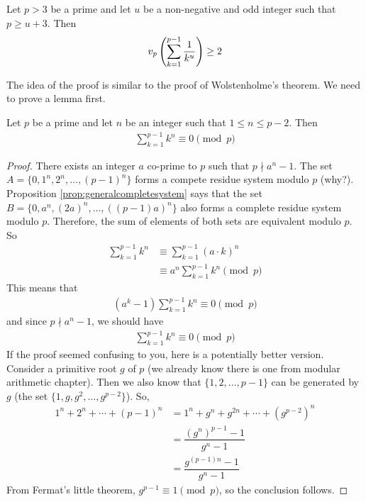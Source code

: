 	\begin{theorem}
		Let $p>3$ be a prime and let $u$ be a non-negative and odd integer such that $p \geq u+3$. Then
		\begin{align*}
		v_{p}\left(\sum_{k = 1}^{p - 1}\frac {1}{k^{u}}\right)\geq 2
		\end{align*}
	\end{theorem}

	The idea of the proof is similar to the proof of Wolstenholme's theorem. We need to prove a lemma first.

	\begin{lemma}\label{lem:darijwolstproof}
		Let $p$ be a prime and let $n$ be an integer such that $1 \leq n \leq p-2$. Then
		\begin{align*}
			\sum_{k = 1}^{p - 1} k^n \equiv 0 \pmod p
		\end{align*}
	\end{lemma}

	\begin{proof}
		There exists an integer $a$ co-prime to $p$ such that $p \nmid a^n -1$. The set $A= \{0, 1^n, 2^n, \ldots, (p-1)^n\}$ forms a compete residue system modulo $p$ (why?). Proposition \eqref{prop:generalcompletesystem} says that the set $B=\{0, a^n, (2a)^n, \ldots, ((p-1)a)^n\}$ also forms a complete residue system modulo $p$. Therefore, the sum of elements of both sets are equivalent modulo $p$. So
		\begin{align*}
			\sum_{k = 1}^{p - 1} k^n
				& \equiv \sum_{k = 1}^{p - 1} (a \cdot k)^n\\
				& \equiv a^n \sum_{k = 1}^{p - 1} k^n \pmod p
		\end{align*}
		This means that
			\begin{align*}
				\left(a^k - 1\right) \sum_{k = 1}^{p - 1} k^n \equiv 0 \pmod p
			\end{align*}
		and since $p \nmid a^n -1$, we should have
			\begin{align*}
				\sum_{k = 1}^{p - 1} k^n \equiv 0 \pmod p
			\end{align*}
		If the proof seemed confusing to you, here is a potentially better version. Consider a primitive root $g$ of $p$ (we already know there is one from modular arithmetic chapter). Then we also know that $\{1,2,\ldots,p-1\}$ can be generated by $g$ (the set $\{1,g,g^2,\ldots,g^{p-2}\}$). So,
			\begin{align*}
				1^n+2^n+\cdots+(p-1)^n
					& = 1^n+g^n+g^{2n}+\cdots+\left(g^{p-2}\right)^n\\
					& = \dfrac{(g^n)^{p-1}-1}{g^n-1}\\
					& = \dfrac{g^{(p-1)n}-1}{g^n-1}
			\end{align*}
		From Fermat's little theorem, $g^{p-1}\equiv1\pmod p$, so the conclusion follows.
	\end{proof}

